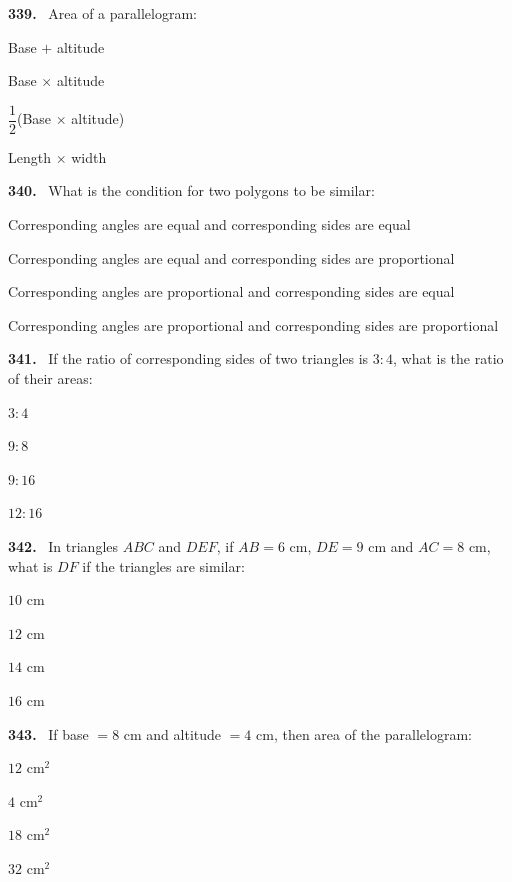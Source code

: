 \documentclass[11pt]{article}
\newenvironment{qenv}[1]{%
  \par\medskip\noindent\textbf{#1.}\ \ignorespaces
}{\par}
\begin{document}
\begin{qenv}{339} Area of a parallelogram:
\begin{options} \item Base $+$ altitude \item Base $\times$ altitude \item $\dfrac{1}{2}$(Base $\times$ altitude) \item Length $\times$ width \end{options} \end{qenv}

\begin{qenv}{340} What is the condition for two polygons to be similar:
\begin{options} \item Corresponding angles are equal and corresponding sides are equal \item Corresponding angles are equal and corresponding sides are proportional \item Corresponding angles are proportional and corresponding sides are equal \item Corresponding angles are proportional and corresponding sides are proportional \end{options} \end{qenv}

\begin{qenv}{341} If the ratio of corresponding sides of two triangles is $3:4$, what is the ratio of their areas:
\begin{options} \item $3:4$ \item $9:8$ \item $9:16$ \item $12:16$ \end{options} \end{qenv}

\begin{qenv}{342} In triangles $ABC$ and $DEF$, if $AB=6$ cm, $DE=9$ cm and $AC=8$ cm, what is $DF$ if the triangles are similar:
\begin{options} \item $10$ cm \item $12$ cm \item $14$ cm \item $16$ cm \end{options} \end{qenv}

\begin{qenv}{343} If base $=8$ cm and altitude $=4$ cm, then area of the parallelogram:
\begin{options} \item $12$ cm$^2$ \item $4$ cm$^2$ \item $18$ cm$^2$ \item $32$ cm$^2$ \end{options} \end{qenv}
\end{document}
